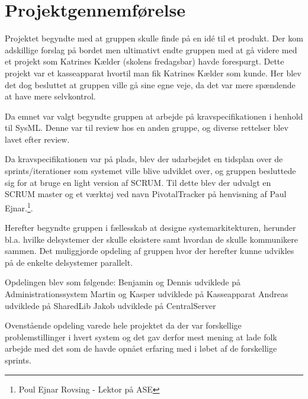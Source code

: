 \section{Projektgennemførelse}
Projektet begyndte med at gruppen skulle finde på en idé til et produkt. Der kom adskillige forslag på bordet men ultimativt endte gruppen med at gå videre med et projekt som Katrines Kælder (skolens fredagsbar) havde forespurgt. Dette projekt var et kasseapparat hvortil man fik Katrines Kælder som kunde. Her blev det dog besluttet at gruppen ville gå sine egne veje, da det var mere spændende at have mere selvkontrol.

Da emnet var valgt begyndte gruppen at arbejde på kravspecifikationen i henhold til SysML. Denne var til review hos en anden gruppe, og diverse rettelser blev lavet efter review.

Da kravspecifikationen var på plads, blev der udarbejdet en tidsplan over de sprints/iterationer som systemet ville blive udviklet over, og gruppen besluttede sig for at bruge en light version af SCRUM. Til dette blev der udvalgt en SCRUM master og et værktøj ved navn PivotalTracker på henvisning af Paul Ejnar.\footnote{Poul Ejnar Rovsing - Lektor på ASE}.

Herefter begyndte gruppen i fællesskab at designe systemarkitekturen, herunder bl.a. hvilke delsystemer der skulle eksistere samt hvordan de skulle kommunikere sammen. Det muliggjorde opdeling af gruppen hvor der herefter kunne udvikles på de enkelte delsystemer parallelt.

Opdelingen blev som følgende:
Benjamin og Dennis udviklede på Administrationssystem
Martin og Kasper udviklede på Kasseapparat
Andreas udviklede på SharedLib
Jakob udviklede på CentralServer

Ovenstående opdeling varede hele projektet da der var forskellige problemstillinger i hvert system og det gav derfor mest mening at lade folk arbejde med det som de havde opnået erfaring med i løbet af de forskellige sprints.